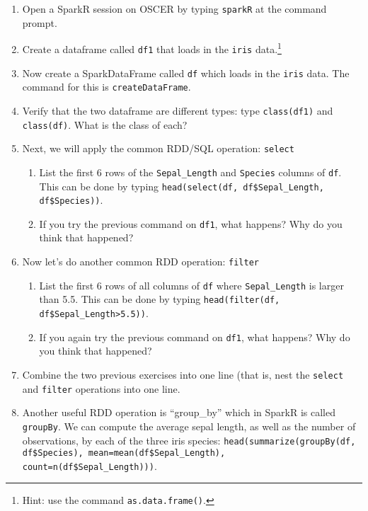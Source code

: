 \documentclass[12pt,english]{exam}
\begin{document}
\begin{questions}
\begin{enumerate}
    \item Open a SparkR session on OSCER by typing \texttt{sparkR} at the command prompt.
    \item Create a dataframe called \texttt{df1} that loads in the \texttt{iris} data.\footnote{Hint: use the command \texttt{as.data.frame()}.}
    \item Now create a SparkDataFrame called \texttt{df} which loads in the \texttt{iris} data. The command for this is \texttt{createDataFrame}.
    \item Verify that the two dataframe are different types: type \texttt{class(df1)} and \texttt{class(df)}. What is the class of each?
    \item Next, we will apply the common RDD/SQL operation: \texttt{select}
    \begin{enumerate}
    \item List the first 6 rows of the \texttt{Sepal\_Length} and \texttt{Species} columns of \texttt{df}. This can be done by typing \texttt{head(select(df, df\$Sepal\_Length, df\$Species))}.
    \item If you try the previous command on \texttt{df1}, what happens? Why do you think that happened?
    \end{enumerate}
    \item Now let's do another common RDD operation: \texttt{filter} 
    \begin{enumerate}
    \item List the first 6 rows of all columns of \texttt{df} where \texttt{Sepal\_Length} is larger than 5.5. This can be done by typing \texttt{head(filter(df, df\$Sepal\_Length>5.5))}.
    \item If you again try the previous command on \texttt{df1}, what happens? Why do you think that happened?
    \end{enumerate}
    \item Combine the two previous exercises into one line (that is, nest the \texttt{select} and \texttt{filter} operations into one line.
    \item Another useful RDD operation is ``group\_by'' which in SparkR is called \texttt{groupBy}. We can compute the average sepal length, as well as the number of observations, by each of the three iris species: \texttt{head(summarize(groupBy(df, df\$Species), mean=mean(df\$Sepal\_Length), count=n(df\$Sepal\_Length)))}.
\end{enumerate}


\end{questions}
\end{document}
